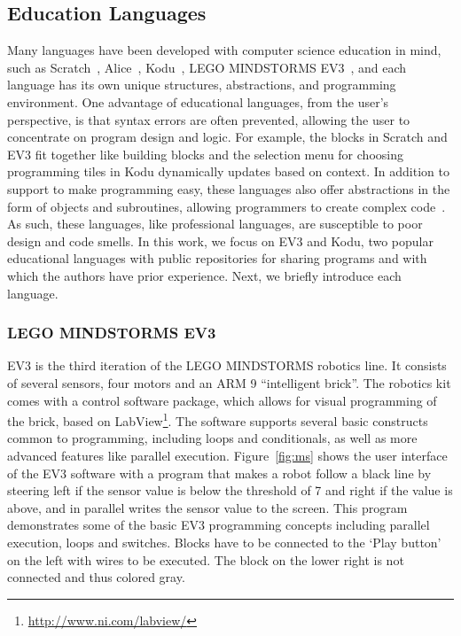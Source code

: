 \documentclass[conference]{IEEEtran}
\newcommand{\ms}{LEGO MINDSTORMS EV3}
\begin{document}
\subsection{Education Languages}

Many languages have been developed with computer science education in mind, such as Scratch~\cite{scratch}, Alice~\cite{aliceIntro}, Kodu~\cite{kodugrammar}, \ms~\cite{lego}, and each language has its own unique structures, abstractions, and programming environment. One advantage of
educational languages, from the user's perspective, is that syntax errors are often prevented, allowing the user to concentrate on program design and logic. For example, the blocks in Scratch and EV3 fit together like building blocks and the selection menu for choosing programming tiles in Kodu dynamically updates based on context. In addition to support to make programming easy, these languages also offer abstractions in the form of objects and subroutines, allowing programmers to create complex code~\cite{Stolee:2011:ECS:1953163.1953197}. As such, these languages, like professional languages, are susceptible to poor design and code smells. In this work, we focus on EV3 and Kodu, two popular educational languages with public repositories for sharing programs and with which the authors have prior experience. Next, we briefly introduce each language. 


\subsubsection{\ms}
\label{sec:lego}
EV3 is the third iteration of the LEGO MINDSTORMS robotics line. It consists of several sensors, four motors and an ARM 9 ``intelligent brick''. The robotics kit comes with a control software package, which allows for visual programming of the brick, based on LabView\footnote{\url{http://www.ni.com/labview/}}. The software supports several basic constructs common to programming, including loops and conditionals, as well as more advanced features like parallel execution. Figure~\ref{fig:ms} shows the user interface of the EV3 software with a program that makes a robot follow a black line by steering left if the sensor value is below the threshold of 7 and right if the value is above, and in parallel writes the sensor value to the screen. This program demonstrates some of the basic EV3 programming concepts including parallel execution, loops and switches. Blocks have to be connected to the `Play button' on the left with wires to be executed. The block on the lower right is not connected and thus colored gray.
\end{document}
